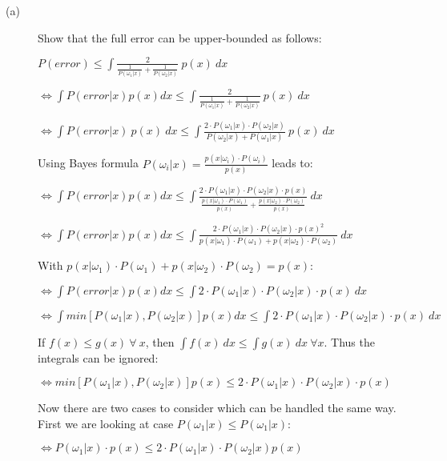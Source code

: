 \documentclass{article}
\begin{document}
\begin{description}
\item[(a)] Show that the full error can be upper-bounded as follows:

$P(error) \leq \int \frac{2}{\frac{1}{P(\omega_1|x)} + \frac{1}{P(\omega_2|x)}}\ p(x)\ dx$

$\Leftrightarrow \int P(error|x)p(x)dx \leq \int \frac{2}{\frac{1}{P(\omega_1|x)} + \frac{1}{P(\omega_2|x)}}\ p(x)\ dx$

$\Leftrightarrow \int P(error|x)\ p(x)\ dx \leq \int \frac{2 \cdot P(\omega_1|x) \cdot P(\omega_2|x) }{P(\omega_2|x) + P(\omega_1|x)}\ p(x)\ dx$

\vspace{0.3cm}
Using Bayes formula $P(\omega_i|x) = \frac{p(x|\omega_i) \cdot P(\omega_i)}{p(x)}$ leads to:
\vspace{0.3cm}

$\Leftrightarrow \int P(error|x)p(x)dx \leq \int \frac{2 \cdot P(\omega_1|x) \cdot P(\omega_2|x) \cdot p(x) }{\frac{p(x|\omega_1) \cdot P(\omega_1)}{p(x)} + \frac{p(x|\omega_2) \cdot P(\omega_2)}{p(x)}}\ dx$

$\Leftrightarrow \int P(error|x)p(x)dx \leq \int \frac{2 \cdot P(\omega_1|x) \cdot P(\omega_2|x) \cdot p(x)^2 }{p(x|\omega_1) \cdot P(\omega_1) + p(x|\omega_2) \cdot P(\omega_2)}\ dx$

\vspace{0.3cm}
With $p(x|\omega_1) \cdot P(\omega_1) + p(x|\omega_2) \cdot P(\omega_2) = p(x)$:
\vspace{0.3cm}

$\Leftrightarrow \int P(error|x)p(x)dx \leq \int 2 \cdot P(\omega_1|x) \cdot P(\omega_2|x) \cdot p(x)\ dx$

$\Leftrightarrow \int min[P(\omega_1|x), P(\omega_2|x)]p(x)dx \leq \int 2 \cdot P(\omega_1|x) \cdot P(\omega_2|x) \cdot p(x)\ dx$

\vspace{0.3cm}
If $f(x) \leq g(x)\  \forall \  x$, then $\int f(x)\ dx \leq \int g(x)\  dx \  \forall x$. Thus the integrals can be ignored:

$\Leftrightarrow min[P(\omega_1|x), P(\omega_2|x)]p(x) \leq 2 \cdot P(\omega_1|x) \cdot P(\omega_2|x) \cdot p(x)$

\vspace{0.3cm}
Now there are two cases to consider which can be handled the same way. First we are looking at case $ P(\omega_1|x) \leq P(\omega_1|x)$:

\vspace{0.3cm}
$\Leftrightarrow P(\omega_1|x) \cdot p(x) \leq 2 \cdot P(\omega_1|x) \cdot P(\omega_2|x) p(x) $


\end{description}
\end{document}
